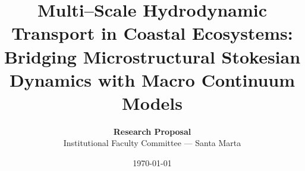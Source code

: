 \title{\textbf{Multi--Scale Hydrodynamic Transport in Coastal Ecosystems:\\ Bridging Microstructural Stokesian Dynamics with Macro Continuum Models}}
\author{\textbf{Research Proposal} \\ Institutional Faculty Committee --- Santa Marta}
\date{\today}
